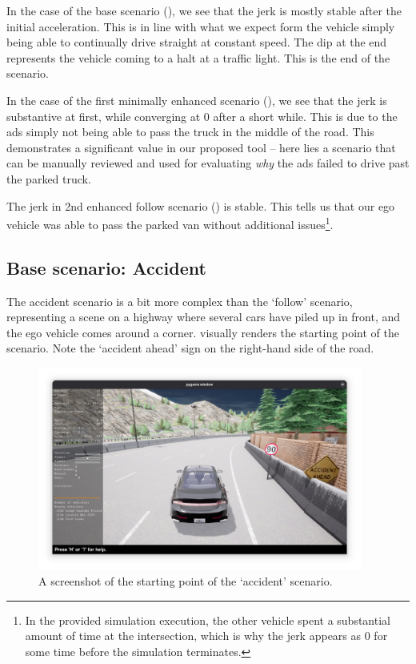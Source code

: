 In the case of the base scenario (), we see that the jerk is mostly stable
after the initial acceleration. This is in line with what we expect form the vehicle simply being
able to continually drive straight at constant speed. The dip at the end represents the vehicle coming to a halt at a traffic light. This is the end of the
scenario.

In the case of the first minimally enhanced scenario (), we
see that the jerk is substantive at first, while converging at \num{0} after a short while. This is
due to the \acrshort{ads} simply not being able to pass the truck in the middle of the road. This
demonstrates a significant value in our proposed tool -- here lies a scenario that can be manually
reviewed and used for evaluating \emph{why} the \acrshort{ads} failed to drive past the parked truck.

The jerk in 2nd enhanced follow scenario () is stable. This
tells us that our ego vehicle was able to pass the parked van without additional issues\footnote{In
    the provided simulation execution, the other vehicle spent a substantial amount of time at the
    intersection, which is why the jerk appears as \num{0} for some time before the simulation
    terminates.}.

\subsection{Base scenario: Accident}\label{chp:resultsAccidentScenario}

The accident scenario is a bit more complex than the `follow' scenario, representing a scene on a
highway where several cars have piled up in front, and the ego vehicle comes around a corner.
 visually renders the starting point of the scenario. Note the
`accident ahead' sign on the right-hand side of the road.

\begin{figure}[htb]
    \centering
    \includegraphics[width=0.95\textwidth]{experiment-material/accident-pics/base/startpoint.png}
    \caption{A screenshot of the starting point of the `accident'
        scenario.}\label{fig:accidentBaseStartPoint}
\end{figure}


